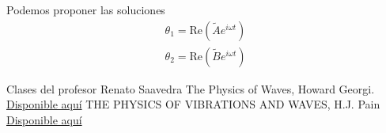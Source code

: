 \documentclass[12pt]{article}
\begin{document}
Podemos proponer las soluciones
\begin{align*}
    \theta_1 = \text{Re}(\tilde{A} e^{i\omega t})\\
    \theta_2 = \text{Re}(\tilde{B} e^{i\omega t})
\end{align*}




\begin{thebibliography}{99}
     Clases del profesor Renato Saavedra
     The Physics of Waves, Howard Georgi. \href{https://ocw.mit.edu/courses/8-03sc-physics-iii-vibrations-and-waves-fall-2016/ef731c1b91d77a6db003f6c27e300d25_MIT8_03SCF16_Textbook.pdf}{Disponible aquí}
     THE PHYSICS OF VIBRATIONS AND WAVES, H.J. Pain \href{http://103.76.208.7:8080/jspui/bitstream/123456789/616/1/Pain%20PHYSICS%20OF%20VIBRATIONS%20AND%20WAVES%206-th%20Edition.pdf}{Disponible aquí}
\end{thebibliography}
\end{document}
